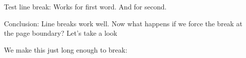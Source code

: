 \documentclass[a5paper,twocolumn]{scrartcl}
\begin{document}
  \lipsum[1]
  \lipsum[2]
  Test line break:
  \citep{strunk-and-white}
  Works for first word.
  \citep{strunk-and-white}
  And for second.

  Conclusion: Line breaks work well.
  Now what happens if we force the break at the page boundary?
  Let's take a look

  We make this just long enough to break:
  \citep{strunk-and-white}
  
\end{document}
